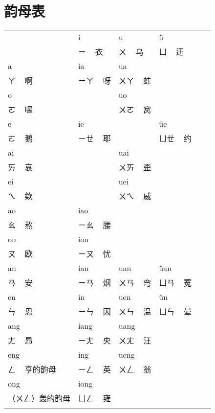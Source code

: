 \documentclass[zihao=-4,fontset=none]{ctexart}
\begin{document}
\vspace{2em}

\section{韵母表}

\begin{center}
  \begin{tabular}{Vp{4cm}|p{2.5cm}|p{2.5cm}|p{2.5cm}V}
        & i    & u    & ü   \\                  & ㄧ   ~ 衣 & ㄨ   ~ 乌 & ㄩ   ~ 迂 \\ \hline
    a   & ia   & ua   &     \\ ㄚ ~ 啊          & ㄧㄚ ~ 呀 & ㄨㄚ ~ 蛙 &           \\ \hline
    o   &      & uo   &     \\ ㄛ ~ 喔          &           & ㄨㄛ ~ 窝 &           \\ \hline
    e   & ie   &      & üe  \\ ㄜ ~ 鹅          & ㄧㄝ ~ 耶 &           & ㄩㄝ ~ 约 \\ \hline
    ai  &      & uai  &     \\ ㄞ ~ 哀          &           & ㄨㄞ ~ 歪 &           \\ \hline
    ei  &      & uei  &     \\ ㄟ ~ 欸          &           & ㄨㄟ ~ 威 &           \\ \hline
    ao  & iao  &      &     \\ ㄠ ~ 熬          & ㄧㄠ ~ 腰 &           &           \\ \hline
    ou  & iou  &      &     \\ ㄡ ~ 欧          & ㄧㄡ ~ 忧 &           &           \\ \hline
    an  & ian  & uan  & üan \\ ㄢ ~ 安          & ㄧㄢ ~ 烟 & ㄨㄢ ~ 弯 & ㄩㄢ ~ 冤 \\ \hline
    en  & in   & uen  & ün  \\ ㄣ ~ 恩          & ㄧㄣ ~ 因 & ㄨㄣ ~ 温 & ㄩㄣ ~ 晕 \\ \hline
    ang & iang & uang &     \\ ㄤ ~ 昂          & ㄧㄤ ~ 央 & ㄨㄤ ~ 汪 &           \\ \hline
    eng & ing  & ueng &     \\ ㄥ ~ 亨的韵母    & ㄧㄥ ~ 英 & ㄨㄥ ~ 翁 &           \\ \hline
    ong & iong &      &     \\ （ㄨㄥ）轰的韵母 & ㄩㄥ ~ 雍 &           &           \\
  \end{tabular}
\end{center}
\end{document}
